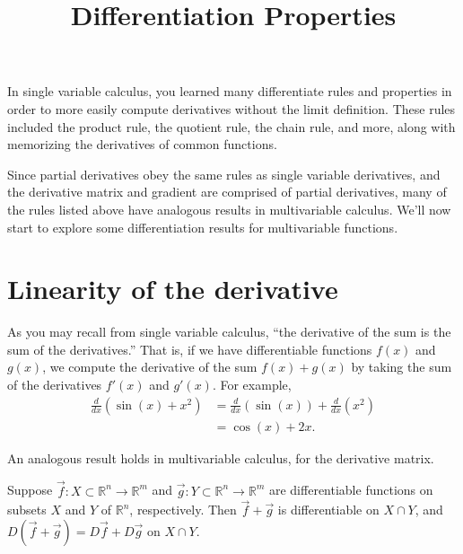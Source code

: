 \documentclass{ximera}
\title{Differentiation Properties}
\begin{document}
\begin{abstract}
\end{abstract}
\maketitle

In single variable calculus, you learned many differentiate rules and properties in order to more easily compute derivatives without the limit definition. These rules included the product rule, the quotient rule, the chain rule, and more, along with memorizing the derivatives of common functions.

Since partial derivatives obey the same rules as single variable derivatives, and the derivative matrix and gradient are comprised of partial derivatives, many of the rules listed above have analogous results in multivariable calculus. We'll now start to explore some differentiation results for multivariable functions.

\section*{Linearity of the derivative}

As you may recall from single variable calculus, ``the derivative of the sum is the sum of the derivatives.'' That is, if we have differentiable functions $f(x)$ and $g(x)$, we compute the derivative of the sum $f(x)+g(x)$ by taking the sum of the derivatives $f'(x)$ and $g'(x)$. For example,
\begin{align*}
\frac{d}{dx}\left(\sin(x)+x^2\right) &= \frac{d}{dx}\left(\sin(x)\right) + \frac{d}{dx}\left(x^2\right)\\
&= \cos(x)+2x.
\end{align*}

An analogous result holds in multivariable calculus, for the derivative matrix.

\begin{proposition}
Suppose $\vec{f}:X\subset \mathbb{R}^n\rightarrow \mathbb{R}^m$ and $\vec{g}:Y\subset\mathbb{R}^n\rightarrow\mathbb{R}^m$ are differentiable functions on subsets $X$ and $Y$ of $\mathbb{R}^n$, respectively. Then $\vec{f}+\vec{g}$ is differentiable on $X\cap Y$, and $D(\vec{f}+\vec{g})=D\vec{f}+D\vec{g}$ on $X\cap Y$.
\end{proposition}
\end{document}
